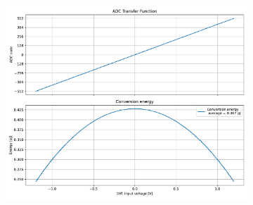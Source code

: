 \documentclass[varwidth]{standalone}
\begin{document}
\begin{figure}
\begin{subfigure}{0.32\textwidth}
    \includegraphics[width=\textwidth]{behavioral_10b_devnoise_energy.pdf}
\end{subfigure}
\end{figure}
\end{document}
